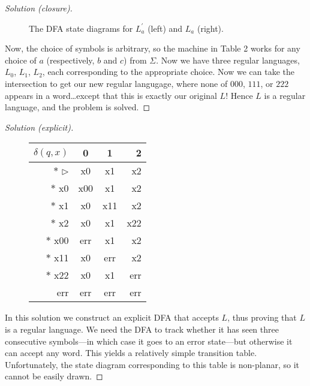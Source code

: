 \begin{proof}[Solution (closure)]
\begin{figure}[ht]
\begin{minipage}{0.48\textwidth}
\centering
{}
\end{minipage}
\caption{The DFA state diagrams for $L_a^\prime$ (left) and $L_a$ (right).}
\end{figure}
Now, the choice of symbols is arbitrary, so the machine in Table 2 works for any choice of $a$ (respectively, $b$ and $c$) from $\Sigma$. Now we have three regular languages, $L_0$, $L_1$, $L_2$, each corresponding to the appropriate choice. Now we can take the intersection to get our new regular langugage, where none of $000$, $111$, or $222$ appears in a word\ldots except that this is exactly our original $L$! Hence $L$ is a regular language, and the problem is solved.\end{proof}
\begin{proof}[Solution (explicit)]
\begin{figure}[ht]
\centering
\setlength\tabcolsep{10pt}
\begin{tabular}{r | c | c | r}
$\delta(q, x)$   & 0   & 1   & 2   \\
\hline
$\ast$ $\rhd$    & x0  & x1  & x2  \\
$\ast$ x0        & x00 & x1  & x2  \\
$\ast$ x1        & x0  & x11 & x2  \\
$\ast$ x2        & x0  & x1  & x22 \\
$\ast$ x00       & err & x1  & x2  \\
$\ast$ x11       & x0  & err & x2  \\
$\ast$ x22       & x0  & x1  & err \\
       err       & err & err & err \\
\end{tabular}
\label{tab:ttable1c1}
\end{figure}
In this solution we construct an explicit DFA that accepts $L$, thus proving that $L$ is a regular language. We need the DFA to track whether it has seen three consecutive symbols---in which case it goes to an error state---but otherwise it can accept any word. This yields a relatively simple transition table. Unfortunately, the state diagram corresponding to this table is non-planar, so it cannot be easily drawn.
\end{proof}